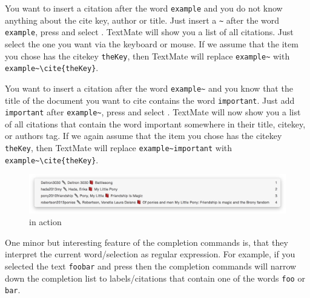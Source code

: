 \documentclass[11pt, x11names]{article}
\begin{document}
\begin{itemize}

  \item You want to insert a citation after the word \texttt{example} and you do not know anything about the cite key, author or title. Just insert a \texttt{\textasciitilde{}} after the word \texttt{example}, press \keys{\Alt + \esc} and select . TextMate will show you a list of all citations. Just select the one you want via the keyboard or mouse. If we assume that the item you chose has the citekey \texttt{theKey}, then TextMate will replace \texttt{example\textasciitilde{}} with \texttt{example\textasciitilde{}\textbackslash{}cite\{theKey\}}.

  \begin{sloppypar}
  \item You want to insert a citation after the word \texttt{example\textasciitilde{}} and you know that the title of the document you want to cite contains the word \texttt{important}. Just add \texttt{important} after \texttt{example\textasciitilde{}}, press \keys{\Alt + \esc} and select . TextMate will now show you a list of all citations that contain the word important somewhere in their title, citekey, or authors tag. If we again assume that the item you chose has the citekey \texttt{theKey}, then TextMate will replace \texttt{example\textasciitilde{}important} with \texttt{example\textasciitilde{}\textbackslash{}cite\{theKey\}}.
  \end{sloppypar}

\end{itemize}

\begin{figure}[h]
  \centering
    \includegraphics[width=\textwidth]{Figures/Citation Completion.png}
  \caption{ in action}
  \label{fig:Figures_Citation_Completion}
\end{figure}

One minor but interesting feature of the completion commands is, that they interpret the current word/selection as regular expression. For example, if you selected the text \texttt{foo\textbar{}bar} and press \keys{\Alt + \esc} then the completion commands will narrow down the completion list to labels/citations that contain one of the words \texttt{foo} or \texttt{bar}.
\end{document}
